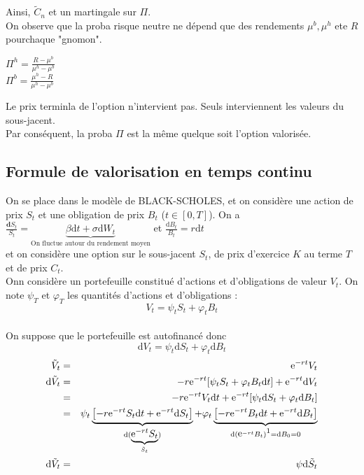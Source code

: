 \documentclass{report}
\begin{document}
Ainsi, $\tilde{C}_n$ et un martingale sur $\Pi$.\\
On observe que la proba risque neutre ne dépend que des rendements $\mu^b, \mu^h$ ete $R$ pourchaque "gnomon".
\begin{multicols}{2}
\centering
$\Pi^h = \displaystyle\frac{R-\mu^b}{\mu^h-\mu^b}$\\
$\Pi^b = \displaystyle\frac{\mu^h-R}{\mu^h-\mu^b}$
\end{multicols}
Le prix terminla de l'option n'intervient pas. Seuls interviennent les valeurs du sous-jacent.\\
Par conséquent, la proba $\Pi$ est la même quelque soit l'option valorisée.



\subsection{Formule de valorisation en temps continu}
On se place dans le modèle de BLACK-SCHOLES, et on considère une action de prix $S_t$ et une obligation de prix $B_t$ ($t\in [0,T]$).
On a $\displaystyle\frac{\mathbf{d}S_t}{S_t} = \underbrace{\beta\mathrm{d}t+\sigma\mathrm{d}W_t}_{\mbox{On fluctue autour du rendement moyen}}$ et $\displaystyle\frac{\mathrm{d}B_t}{B_t}=r\mathrm{d}t$\\
et on considère une option sur le sous-jacent $S_t$, de prix d'exercice $K$ au terme $T$ et de prix $C_t$.\\
Onn considère un portefeuille constitué d'actions et d'obligations de valeur $V_t$. On note $\psi_T$ et $\varphi_T$ les quantités d'actions et d'obligations : \[V_t = \psi_tS_t+\varphi_tB_t\]\\
On suppose que le portefeuille est autofinancé donc \[\mathrm{d}V_t = \psi_t\mathrm{d}S_t+\varphi_t\mathrm{d}B_t\]
\begin{eqnarray}
\tilde{V}_t&=& \mbox{e}^{-rt}V_t\nonumber\\
\mathrm{d}\tilde{V}_t &=& -r\mbox{e}^{-rt}[\psi_tS_t+\varphi_tB_t\mathrm{d}t]+\mbox{e}^{-rt}\mathrm{d}V_t\nonumber\\
&=& -r\mbox{e}^{-rt}V_t\mathrm{d}t+\mbox{e}^{-rt}[\psi_t\mathrm{d}S_t+\varphi_t\mathrm{d}B_t]\nonumber\\
&=& \psi_t\underbrace{\left[-r\mbox{e}^{-rt}S_t\mathrm{d}t+\mbox{e}^{-rt}\mathrm{d}S_t\right]}_{\mathrm{d}(\underbrace{\mbox{e}^{-rt}S_t}_{\tilde{S}_t})}+\varphi_t\underbrace{\left[-r\mbox{e}^{-rt}B_t\mathrm{d}t+\mbox{e}^{-rt}\mathrm{d}B_t\right]}_{\mathrm{d}(\mbox{e}^{-rt}B_t)\footnotemark=\mathrm{d}B_0=0}\nonumber\\
\mathrm{d}\tilde{V}_t&=&\psi \mathrm{d}\tilde{S}_t\nonumber
\end{eqnarray}
\end{document}
